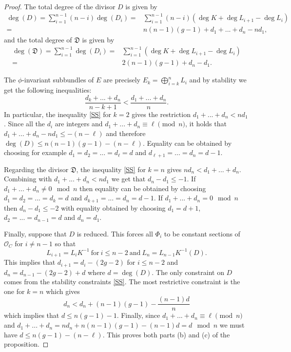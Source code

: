 \documentclass[twoside, 11pt]{article}
\numberwithin{equation}{section}
\theoremstyle{theorem}
\numberwithin{theorem}{section}
\theoremstyle{definition}
\begin{document}
\begin{proof}
The total degree of the divisor $D$ is given by 
%
\begin{equation}
\begin{split}
\deg(D) = \sum\limits_{i=1}^{n-1} (n-i)\deg(D_i) =& \sum\limits_{i=1}^{n-1}(n-i)(\deg K + \deg L_{i+1}-\deg L_i)\\ =& n(n-1)(g-1) + d_1+...+d_n-nd_1,
\end{split}
\end{equation}
%
and the total degree of $\mathfrak D$ is given by 
%
\begin{equation}
\begin{split}
\deg(\mathfrak D) = \sum\limits_{i=1}^{n-1}\deg(D_i) =& \sum\limits_{i=1}^{n-1}(\deg K + \deg L_{i+1}-\deg L_i)\\ =& 2(n-1)(g-1) + d_n-d_1. 
\end{split}
\end{equation}
%

The $\phi$-invariant subbundles of $E$ are precisely $E_k = \bigoplus\limits_{i=k}^n L_i$ and by stability we get the following inequalities: 
%
\begin{equation}\label{SS}
\frac{d_k+...+d_n}{n-k+1} < \frac{d_1+...+d_n}{n}.
\end{equation}
%
In particular, the inequality \eqref{SS} for $k =2$ gives the restriction $d_1+...+d_n < nd_1$. Since all the $d_i$ are integers and $d_1+...+d_n \equiv \ell \pmod{n}$, it holds that $d_1+...+d_n - nd_1\le -(n-\ell)$ and therefore $\deg(D) \le n(n-1)(g-1)-(n-\ell)$. Equality can be obtained by choosing for example $d_1=d_2=...=d_\ell = d$ and $d_{\ell+1}=... = d_n = d-1$. 

Regarding the divisor $\mathfrak D$, the inequality \eqref{SS} for $k=n$ gives $nd_n < d_1+...+d_n$. Combining with $d_1+...+d_n < nd_1$ we get that $d_n -d_1 \le -1$. If $d_1+...+d_n \neq 0 \mod n$ then equality can be obtained by choosing $d_1=d_2=...=d_k = d$ and $d_{k+1}=... = d_n = d-1$. If $d_1+...+d_n = 0 \mod n$ then $d_n -d_1 \le -2$ with equality obtained by choosing $d_1 = d+1$, $d_2=...=d_{n-1} = d$ and $d_n = d_1$.

Finally, suppose that $D$ is reduced. This forces all $\Phi_i$ to be constant sections of $\mathcal{O}_C$ for $i\neq n-1$ so that 
%
\begin{equation*}
L_{i+1} = L_iK^{-1}~\text{for}~i\le n-2~\text{and}~L_n = L_{n-1}K^{-1}(D).
\end{equation*}
%
This implies that $d_{i+1} = d_i -(2g-2)$ for $i\le n-2$ and $d_n = d_{n-1} -(2g-2) + d$ where $d = \deg(D)$. The only constraint on $D$ comes from the stability constraints \eqref{SS}. The most restrictive constraint is the one for $k=n$ which gives 
%
\begin{equation*}
d_n < d_n + (n-1)(g-1) - \frac{(n-1)d}{n}
\end{equation*}
%
which implies that $d \le n(g-1)-1$. Finally, since $d_1+...+d_n \equiv \ell \pmod{n}$ and $d_1+...+d_n = nd_n + n(n-1)(g-1) -(n-1)d = d \mod n$ we must have $d \le n(g-1) - (n-\ell)$. 
This proves both parts (b) and (c) of the proposition.
\end{proof}
\end{document}
